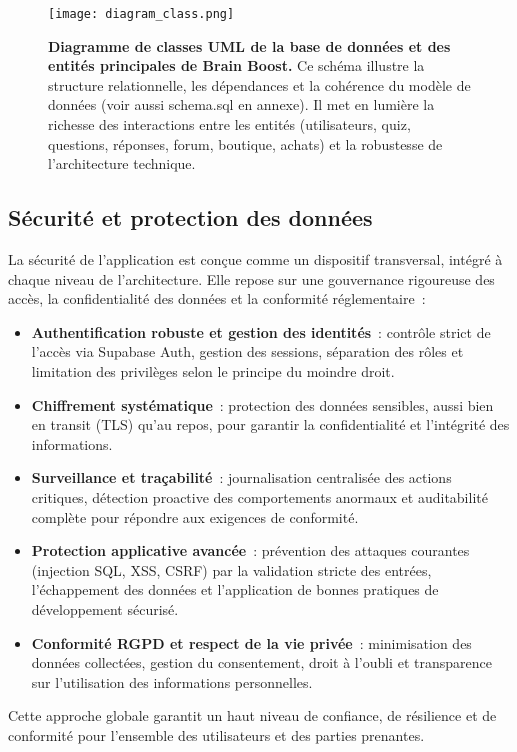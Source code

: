 \documentclass[a4paper,11pt]{report}
\begin{document}
\begin{figure}[p]
    \centering
    \texttt{[image: diagram\_class.png]}
    \caption{\textbf{Diagramme de classes UML de la base de données et des entités principales de Brain Boost.} Ce schéma illustre la structure relationnelle, les dépendances et la cohérence du modèle de données (voir aussi schema.sql en annexe). Il met en lumière la richesse des interactions entre les entités (utilisateurs, quiz, questions, réponses, forum, boutique, achats) et la robustesse de l'architecture technique.}
\end{figure}
\clearpage

\subsection{Sécurité et protection des données}
La sécurité de l'application est conçue comme un dispositif transversal, intégré à chaque niveau de l'architecture. Elle repose sur une gouvernance rigoureuse des accès, la confidentialité des données et la conformité réglementaire :
\begin{itemize}
    \item \textbf{Authentification robuste et gestion des identités} : contrôle strict de l'accès via Supabase Auth, gestion des sessions, séparation des rôles et limitation des privilèges selon le principe du moindre droit.
    \item \textbf{Chiffrement systématique} : protection des données sensibles, aussi bien en transit (TLS) qu'au repos, pour garantir la confidentialité et l'intégrité des informations.
    \item \textbf{Surveillance et traçabilité} : journalisation centralisée des actions critiques, détection proactive des comportements anormaux et auditabilité complète pour répondre aux exigences de conformité.
    \item \textbf{Protection applicative avancée} : prévention des attaques courantes (injection SQL, XSS, CSRF) par la validation stricte des entrées, l'échappement des données et l'application de bonnes pratiques de développement sécurisé.
    \item \textbf{Conformité RGPD et respect de la vie privée} : minimisation des données collectées, gestion du consentement, droit à l'oubli et transparence sur l'utilisation des informations personnelles.
\end{itemize}
Cette approche globale garantit un haut niveau de confiance, de résilience et de conformité pour l'ensemble des utilisateurs et des parties prenantes.
\end{document}

